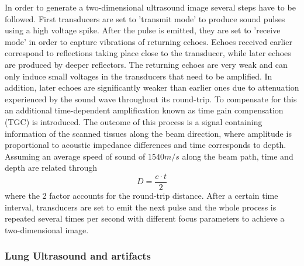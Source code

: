 \documentclass[11pt]{article} %
\begin{document}
	In order to generate a two-dimensional ultrasound image several steps have to be followed. First transducers are set to 'transmit mode' to produce sound pulses using a high voltage spike. After the pulse is emitted, they are set to 'receive mode' in order to capture vibrations of returning echoes. Echoes received earlier correspond to reflections taking place close to the transducer, while later echoes are produced by deeper reflectors.  The returning echoes are very weak and can only induce small voltages in the transducers that need to be amplified. In addition, later echoes are significantly weaker than earlier ones due to attenuation experienced by the sound wave throughout its round-trip. To compensate for this an additional time-dependent amplification known as time gain compensation (TGC) is introduced. The outcome of this process is a signal containing information of the scanned tissues along the beam direction, where amplitude is proportional to acoustic impedance differences and time corresponds to depth. Assuming an average speed of sound of $1540 m/s$ along the beam path, time and depth are related through \[ D = \frac{c·t}{2} \] where the 2 factor accounts for the round-trip distance. After a certain time interval, transducers are set to emit the next pulse and the whole process is repeated several times per second with different focus parameters to achieve a two-dimensional image. 

\subsubsection{Lung Ultrasound and artifacts}

\end{document}
